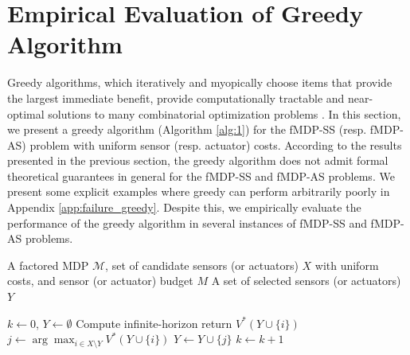 \documentclass[twocolumn]{autart}    %
\begin{document}
\vspace{-2mm}
\section{Empirical Evaluation of Greedy Algorithm}
Greedy algorithms, which iteratively and myopically choose items that provide the largest immediate benefit, provide computationally tractable and near-optimal solutions to many combinatorial optimization problems \cite{hashemi2020randomized,nemhauser1978analysis}. In this section, we present a greedy algorithm (Algorithm \ref{alg:1}) for the fMDP-SS (resp. fMDP-AS) problem with uniform sensor (resp. actuator) costs. {According to the results presented in the previous section, the greedy algorithm does not admit formal theoretical guarantees in general for the fMDP-SS and fMDP-AS problems. We present some explicit examples where greedy can perform arbitrarily poorly in Appendix \ref{app:failure_greedy}. Despite this, we empirically evaluate the performance of the greedy algorithm in several instances of fMDP-SS and fMDP-AS problems.}


\begin{algorithm}[!htpb]
\caption{Greedy Alg. for fMDP-SS (or fMDP-AS)}
\label{alg:1}
\begin{algorithmic}[1] %

\Require A factored MDP $\mathcal{M}$, set of candidate sensors (or actuators) $X$ with uniform costs, and sensor (or actuator) budget $M$
\Ensure A set of selected sensors (or actuators) $Y$

\State $k \gets 0$, $Y \gets \emptyset$
        \State Compute infinite-horizon return $V^*(Y \cup \{i\})$
    \EndFor
    \State $j \gets \arg\max_{i \in X \setminus Y} V^*(Y \cup \{i\})$
    \State $Y \gets Y \cup \{j\}$
    \State $k \gets k + 1$
\EndWhile

\end{algorithmic}
\end{algorithm}
\end{document}
